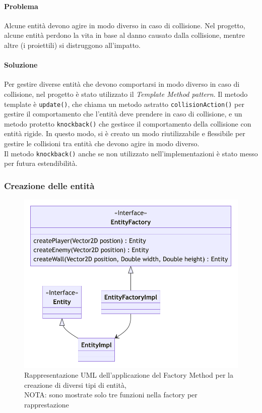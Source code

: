 \documentclass[a4paper,12pt]{report}
\begin{document}
\paragraph{Problema} Alcune entità devono agire in modo diverso in caso di collisione. Nel progetto, 
alcune entità perdono la vita in base al danno causato dalla collisione, mentre altre (i proiettili) si distruggono all'impatto.
\paragraph{Soluzione} Per gestire diverse entità che devono comportarsi in modo diverso in caso di collisione, nel progetto è 
stato utilizzato il \textit{Template Method pattern}. Il metodo template è \texttt{update()}, che chiama un metodo astratto \texttt{collisionAction()} 
per gestire il comportamento che l'entità deve prendere in caso di collisione, e un metodo protetto \texttt{knockback()} che gestisce il 
comportamento della collisione con entità rigide. In questo modo, si è creato un modo riutilizzabile e flessibile per gestire le 
collisioni tra entità che devono agire in modo diverso. \\
Il metodo \texttt{knockback()} anche se non utilizzato nell’implementazioni è stato messo per futura estendibilità.

\subsubsection{Creazione delle entità}

\begin{figure}[H]
\centering{}
\includegraphics[width=\textwidth]{img/EntityFactoryUML.pdf}
\caption{Rappresentazione UML dell'applicazione del Factory Method per la creazione di diversi tipi di entità, 
\\NOTA: sono mostrate solo tre funzioni nella factory per rapprestazione}
\end{figure}
	
\end{document}
